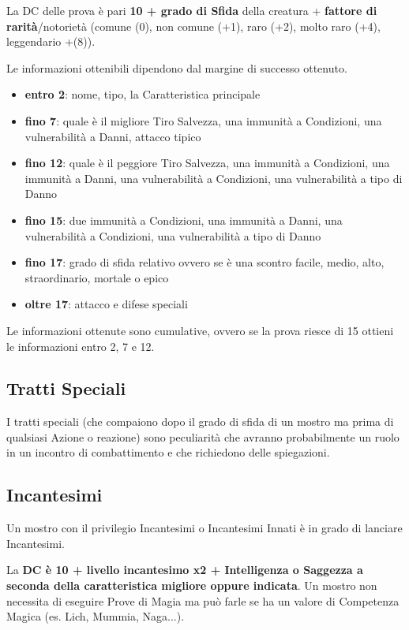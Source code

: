 \begin{multicols}{2}
\medskip

La DC delle prova è pari \textbf{10 + grado di Sfida} della creatura + \textbf{fattore di rarità}/notorietà (comune (0), non comune (+1), raro (+2), molto raro (+4), leggendario +(8)).

Le informazioni ottenibili dipendono dal margine di successo ottenuto. 

\noindent\begin{itemize} \setlength{\itemsep}{0pt}
\item \textbf{entro 2}: nome, tipo, la Caratteristica principale
\item \textbf{fino 7}: quale è il migliore Tiro Salvezza, una immunità a Condizioni, una vulnerabilità a Danni, attacco tipico
\item \textbf{fino 12}: quale è il peggiore Tiro Salvezza, una immunità a Condizioni, una immunità a Danni, una vulnerabilità a Condizioni, una vulnerabilità a tipo di Danno
\item \textbf{fino 15}: due immunità a Condizioni, una immunità a Danni, una vulnerabilità a Condizioni, una vulnerabilità a tipo di Danno
\item \textbf{fino 17}: grado di sfida relativo ovvero se è una scontro facile, medio, alto, straordinario, mortale o epico
\item \textbf{oltre 17}: attacco e difese speciali
\end{itemize}

\medskip

Le informazioni ottenute sono cumulative, ovvero se la prova riesce di 15 ottieni le informazioni entro 2, 7 e 12.

\subsection{Tratti Speciali}

I tratti speciali (che compaiono dopo il grado di sfida di un mostro ma prima di qualsiasi Azione o reazione) sono peculiarità che avranno probabilmente un ruolo in un incontro di combattimento e che richiedono delle spiegazioni.

\subsection{Incantesimi}

Un mostro con il privilegio Incantesimi o Incantesimi Innati è in grado di lanciare Incantesimi.

La \textbf{DC è 10 + livello incantesimo x2 + Intelligenza o Saggezza a seconda della caratteristica migliore oppure indicata}. Un mostro non necessita di eseguire Prove di Magia ma può farle se ha un valore di Competenza Magica (es. Lich, Mummia, Naga...). 


\end{multicols}
